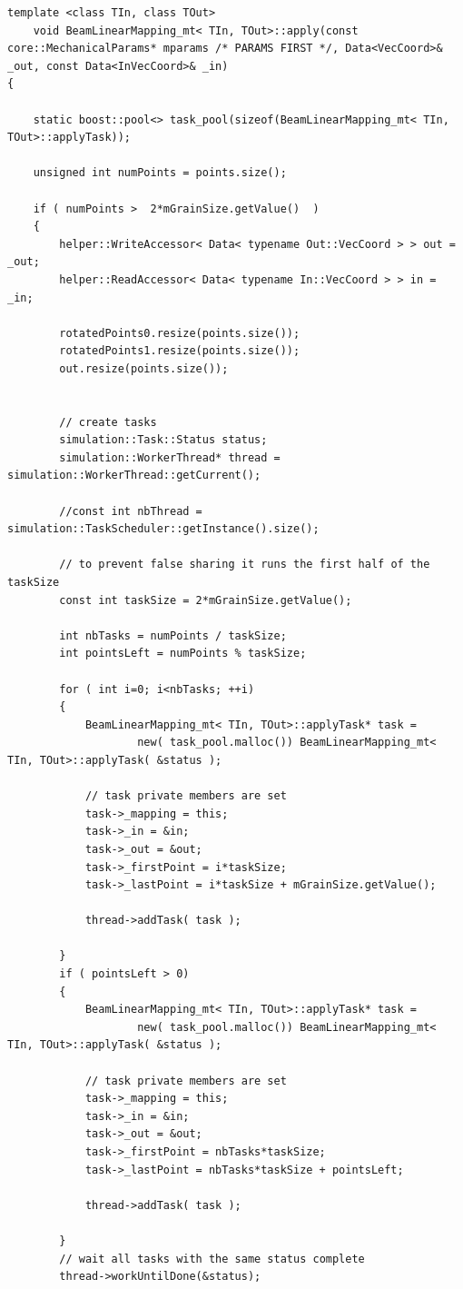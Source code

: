 \documentclass{article}
\begin{document}
\begin{lstlisting}
template <class TIn, class TOut>
	void BeamLinearMapping_mt< TIn, TOut>::apply(const core::MechanicalParams* mparams /* PARAMS FIRST */, Data<VecCoord>& _out, const Data<InVecCoord>& _in)
{

	static boost::pool<> task_pool(sizeof(BeamLinearMapping_mt< TIn, TOut>::applyTask));

	unsigned int numPoints = points.size();

	if ( numPoints >  2*mGrainSize.getValue()  )
	{		
		helper::WriteAccessor< Data< typename Out::VecCoord > > out = _out;
		helper::ReadAccessor< Data< typename In::VecCoord > > in = _in;

		rotatedPoints0.resize(points.size());
		rotatedPoints1.resize(points.size());
		out.resize(points.size());


		// create tasks
		simulation::Task::Status status;
		simulation::WorkerThread* thread = simulation::WorkerThread::getCurrent();	

		//const int nbThread = simulation::TaskScheduler::getInstance().size();

		// to prevent false sharing it runs the first half of the taskSize
		const int taskSize = 2*mGrainSize.getValue();

		int nbTasks = numPoints / taskSize;
		int pointsLeft = numPoints % taskSize;

		for ( int i=0; i<nbTasks; ++i)
		{
			BeamLinearMapping_mt< TIn, TOut>::applyTask* task = 
					new( task_pool.malloc()) BeamLinearMapping_mt< TIn, TOut>::applyTask( &status );

			// task private members are set
			task->_mapping = this;
			task->_in = &in;
			task->_out = &out;
			task->_firstPoint = i*taskSize;
			task->_lastPoint = i*taskSize + mGrainSize.getValue();

			thread->addTask( task );

		}
		if ( pointsLeft > 0)
		{
			BeamLinearMapping_mt< TIn, TOut>::applyTask* task = 
					new( task_pool.malloc()) BeamLinearMapping_mt< TIn, TOut>::applyTask( &status );

			// task private members are set
			task->_mapping = this;
			task->_in = &in;
			task->_out = &out;
			task->_firstPoint = nbTasks*taskSize;
			task->_lastPoint = nbTasks*taskSize + pointsLeft;

			thread->addTask( task );

		}
		// wait all tasks with the same status complete
		thread->workUntilDone(&status);



\end{lstlisting}
\end{document}

